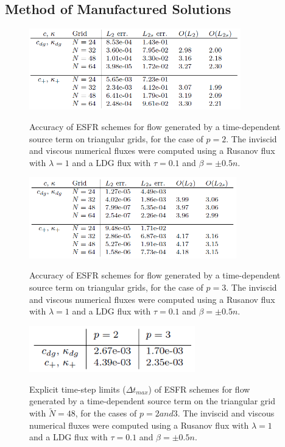 \graphicspath{{figures_manufactured/}}%


\subsection{Method of Manufactured Solutions}

\begin{figure}
\centering
\includegraphics[height=35mm]{table_917} \\
\caption{Accuracy of ESFR schemes for flow generated by a time-dependent source term on triangular grids, for the case of $p = 2$. The inviscid and viscous numerical fluxes were computed using a Rusanov flux with $\lambda = 1$ and a LDG flux with $\tau = 0.1$ and $\beta = \pm 0.5n$.}
\label{fig:table_917}
\end{figure}

\begin{figure}
\centering
\includegraphics[height=35mm]{table_918} \\
\caption{Accuracy of ESFR schemes for flow generated by a time-dependent source term on triangular grids, for the case of $p = 3$. The inviscid and viscous numerical fluxes were computed using a Rusanov flux with $\lambda = 1$ and a LDG flux with $\tau = 0.1$ and $\beta = \pm 0.5n$.}
\label{fig:table_918}
\end{figure}

\begin{figure}
\centering
\includegraphics[height=20mm]{table_919} \\
\caption{Explicit time-step limits ($\Delta t_{max}$) of ESFR schemes for flow generated by a time-dependent source term on the triangular grid with $\tilde{N} = 48$, for the cases of $p = 2 and 3$. The inviscid and viscous numerical fluxes were computed using a Rusanov flux with $\lambda = 1$ and a LDG flux with $\tau = 0.1$ and $\beta = \pm 0.5n$.}
\label{fig:table_919}
\end{figure}

